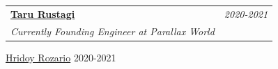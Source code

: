\documentclass[a4paper,11pt]{article}
\makeatletter
\newcommand{\resumeProject}[4]{
\vspace{0.5mm}\item
    \begin{tabular*}{0.98\textwidth}[t]{l@{\extracolsep{\fill}}r}
        \textbf{#1} & \textit{\footnotesize{#3}} \\
        \footnotesize{\textit{#2}} & \footnotesize{#4}
    \end{tabular*}
    \vspace{-2.4mm}
}
\makeatother
\begin{document}
\resumeProject
  {\href{https://www.linkedin.com/in/taru-rustagi/}{Taru Rustagi}}
  {Currently Founding Engineer at Parallax World}
  {2020-2021}

\resumeProject
  {\href{https://www.linkedin.com/in/hridoy-r-764680107/}{Hridoy Rozario}}
  { }
  {2020-2021}
  


  
  
  


  
  

\end{document}
